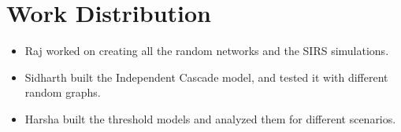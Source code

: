 \documentclass[11pt]{article}
\providecommand{\tightlist}{%
      \setlength{\itemsep}{0pt}\setlength{\parskip}{0pt}}
\begin{document}
    \hypertarget{work-distribution}{%
\section{Work Distribution}\label{work-distribution}}

\begin{itemize}
\tightlist
\item
  Raj worked on creating all the random networks and the SIRS
  simulations.
\item
  Sidharth built the Independent Cascade model, and tested it with
  different random graphs.
\item
  Harsha built the threshold models and analyzed them for different
  scenarios.
\end{itemize}


    
    
    
\end{document}
